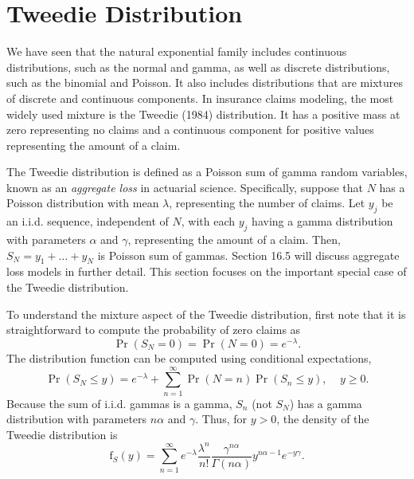 \section{Tweedie Distribution}\label{S13:Tweedie}

We have seen that the natural exponential family includes continuous
distributions, such as the normal and gamma, as well as discrete
distributions, such as the binomial and Poisson. It also includes
distributions that are mixtures of discrete and continuous
components. In insurance claims modeling, the most widely used
mixture is the Tweedie (1984) distribution. It has a positive mass
at zero representing no claims and a continuous component for
positive values representing the amount of a claim.

The Tweedie distribution is defined as a Poisson sum of gamma random
variables, known as an \emph{aggregate loss} in actuarial science.
Specifically, suppose that $N$ has a Poisson distribution with mean
$\lambda$, representing the number of claims. Let {$y_j$} be an
i.i.d. sequence, independent of $N$, with each $y_j$ having a gamma
distribution with parameters $\alpha$ and $\gamma$, representing the
amount of a claim. Then, $S_N = y_1 + \ldots + y_N$ is Poisson sum
of gammas. Section 16.5 will discuss aggregate loss models in
further detail. This section focuses on the important special case
of the Tweedie distribution.

To understand the mixture aspect of the Tweedie distribution, first
note that it is straightforward to compute the probability of zero
claims as
\begin{equation*}
\Pr ( S_N=0) = \Pr (N=0) = e^{-\lambda}.
\end{equation*}
The distribution function can be computed using conditional
expectations,
\begin{equation*}
\Pr ( S_N \leq y) = e^{-\lambda}+\sum_{n=1}^{\infty} \Pr(N=n)
\Pr(S_n \leq y), ~~~~~y \geq 0.
\end{equation*}
Because the sum of i.i.d. gammas is a gamma, $S_n$ (not $S_N$) has a
gamma distribution with parameters $n\alpha$ and $\gamma$. Thus, for
$y>0$, the density of the Tweedie distribution is
\begin{equation}\label{E13:TweedieDensity1}
\mathrm{f}_{S}(y) = \sum_{n=1}^{\infty} e^{-\lambda} \frac{\lambda
^n}{n!} \frac{\gamma^{n \alpha}}{\Gamma(n \alpha)} y^{n \alpha -1}
e^{-y \gamma}.
\end{equation}

